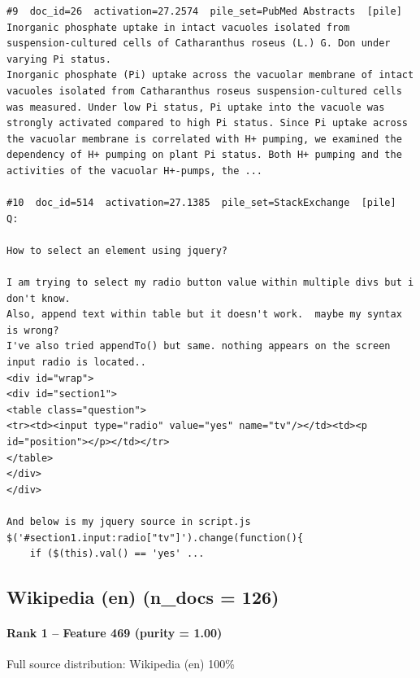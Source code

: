 \begin{verbatim}
#9  doc_id=26  activation=27.2574  pile_set=PubMed Abstracts  [pile]
Inorganic phosphate uptake in intact vacuoles isolated from suspension-cultured cells of Catharanthus roseus (L.) G. Don under varying Pi status.
Inorganic phosphate (Pi) uptake across the vacuolar membrane of intact vacuoles isolated from Catharanthus roseus suspension-cultured cells was measured. Under low Pi status, Pi uptake into the vacuole was strongly activated compared to high Pi status. Since Pi uptake across the vacuolar membrane is correlated with H+ pumping, we examined the dependency of H+ pumping on plant Pi status. Both H+ pumping and the activities of the vacuolar H+-pumps, the ...

#10  doc_id=514  activation=27.1385  pile_set=StackExchange  [pile]
Q:

How to select an element using jquery?

I am trying to select my radio button value within multiple divs but i don't know.
Also, append text within table but it doesn't work.  maybe my syntax is wrong?
I've also tried appendTo() but same. nothing appears on the screen
input radio is located..
<div id="wrap">
<div id="section1">
<table class="question">
<tr><td><input type="radio" value="yes" name="tv"/></td><td><p id="position"></p></td></tr>
</table>
</div>
</div>

And below is my jquery source in script.js
$('#section1.input:radio["tv"]').change(function(){
    if ($(this).val() == 'yes' ...

\end{verbatim}

\subsection*{Wikipedia (en) (n\_docs = 126)}

\paragraph*{Rank 1 -- Feature 469 (purity = 1.00)}

Full source distribution: Wikipedia (en) 100\%

